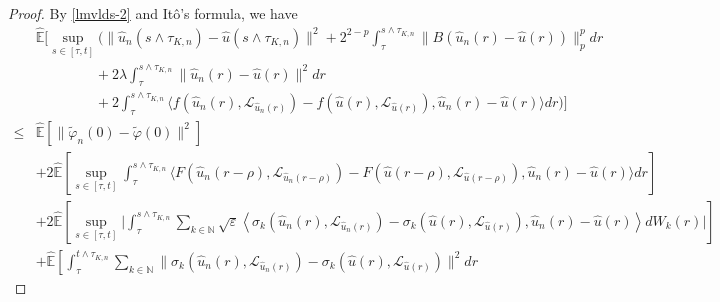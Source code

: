 \documentclass[11pt]{article}
\numberwithin{equation}{section}
\theoremstyle{plain}
\begin{document}
\begin{proof}
 By \eqref{lmvlds-2} and It\^o's formula, we have
  \begin{align}\label{consys-6}
         & \widehat{\mathbb{E}}
           \bigg[ \sup_{s \in [\tau,t]}
                  \Big( \| \hat{u}_n(s \wedge \tau_{K,n}) - \hat{u}(s \wedge \tau_{K,n}) \|^2
                         + 2^{2-p} \int_{\tau}^{s \wedge \tau_{K,n}}
                                       \| B (\hat{u}_n(r) - \hat{u}(r)) \|_p^p dr \nonumber\\
         & \qquad\qquad \
                         + 2 \lambda \int_{\tau}^{s \wedge \tau_{K,n}} \|\hat{u}_n(r) - \hat{u}(r)\|^2 dr  \nonumber\\
         & \qquad\qquad \
                         + 2 \int_{\tau}^{s \wedge \tau_{K,n}}
                                   \langle f(\hat{u}_n(r), \mathcal{L}_{\hat{u}_n(r)})
                                            - f(\hat{u}(r), \mathcal{L}_{\hat{u}(r)}),
                                           \hat{u}_n(r) - \hat{u}(r)
                                   \rangle dr
                   \Big)
            \bigg] \nonumber\\
     \le & \widehat{\mathbb{E}}[\|\widetilde{\varphi}_n(0) - \widetilde{\varphi}(0)\|^2] \nonumber\\
          & + 2 \widehat{\mathbb{E}}
                \left[ \sup_{s \in [\tau,t]}
                       \int_{\tau}^{s \wedge \tau_{K,n}}
                          \langle F(\hat{u}_n(r-\rho), \mathcal{L}_{\hat{u}_n(r-\rho)})
                                  - F(\hat{u}(r-\rho), \mathcal{L}_{\hat{u}(r-\rho)}),
                                  \hat{u}_n(r) - \hat{u}(r)
                          \rangle dr
                \right] \nonumber\\
          & + 2 \widehat{\mathbb{E}}
                   \left[ \sup_{s \in [\tau,t]}
                          \Big| \int_{\tau}^{s \wedge \tau_{K,n}}
                                   \sum_{k \in \mathbb{N} }
                   \sqrt{\varepsilon}
                    \left\langle \sigma_k(\hat{u}_n(r),\mathcal{L}_{\hat{u}_n(r)}) - \sigma_k(\hat{u}(r),\mathcal{L}_{\hat{u}(r)}),
                                                   \hat{u}_n(r) - \hat{u}(r)
                                      \right\rangle dW_k(r)
                          \Big|
                   \right]  \nonumber\\
          & + \widehat{\mathbb{E}}
                 \left[ \int_{\tau}^{t \wedge \tau_{K,n}}
                           \sum_{k \in \mathbb{N} }
                              \|\sigma_k(\hat{u}_n(r),\mathcal{L}_{\hat{u}_n(r)}) - \sigma_k(\hat{u}(r),\mathcal{L}_{\hat{u}(r)})\|^2 dr

\end{align}
\end{proof}
\end{document}
